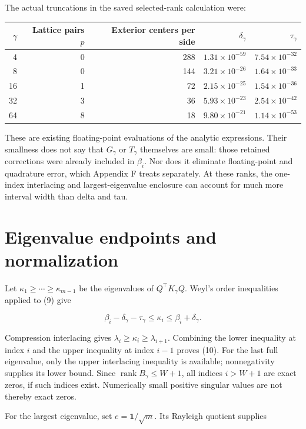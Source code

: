 \documentclass[11pt]{article}
\begin{document}
The actual truncations in the saved selected-rank calculation were:
\begin{center}\small
\begin{tabular}{rrrrr}
\toprule
\(\gamma\) & Lattice pairs \(p\) & Exterior centers per side & \(\delta_\gamma\) & \(\tau_\gamma\)\\
\midrule
4  & 0 & 288 & \(1.31\times10^{-59}\) & \(7.54\times10^{-32}\)\\
8  & 0 & 144 & \(3.21\times10^{-26}\) & \(1.64\times10^{-33}\)\\
16 & 1 & 72  & \(2.15\times10^{-25}\) & \(1.54\times10^{-36}\)\\
32 & 3 & 36  & \(5.93\times10^{-23}\) & \(2.54\times10^{-42}\)\\
64 & 8 & 18  & \(9.80\times10^{-21}\) & \(1.14\times10^{-53}\)\\
\bottomrule
\end{tabular}
\end{center}
These are existing floating-point evaluations of the analytic expressions. Their smallness does not say that \(G_\gamma\) or \(T_\gamma\) themselves are small: those retained corrections were already included in \(\beta_i\). Nor does it eliminate floating-point and quadrature error, which Appendix F treats separately. At these ranks, the one-index interlacing and largest-eigenvalue enclosure can account for much more interval width than delta and tau.

\section{Eigenvalue endpoints and normalization}

Let \(\kappa_1\ge\cdots\ge\kappa_{m-1}\) be the eigenvalues of \(Q^\top K_\gamma Q\). Weyl's order inequalities applied to (9) give

\[
\beta_i-\delta_\gamma-\tau_\gamma\le\kappa_i\le\beta_i+\delta_\gamma.
\]

Compression interlacing gives \(\lambda_i\ge\kappa_i\ge\lambda_{i+1}\). Combining the lower inequality at index \(i\) and the upper inequality at index \(i-1\) proves (10). For the last full eigenvalue, only the upper interlacing inequality is available; nonnegativity supplies its lower bound. Since \(\operatorname{rank}B_\gamma\le W+1\), all indices \(i>W+1\) are exact zeros, if such indices exist. Numerically small positive singular values are not thereby exact zeros.

For the largest eigenvalue, set \(e=\mathbf1/\sqrt m\). Its Rayleigh quotient supplies
\end{document}
